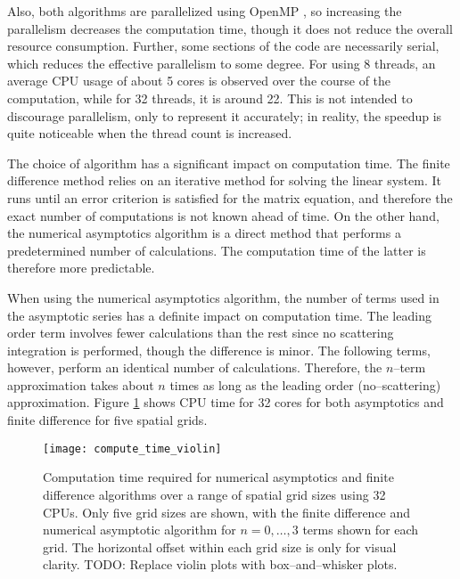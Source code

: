 Also, both algorithms are parallelized using OpenMP \cite{message_passing_interface_forum_mpi:_1993}, so increasing the parallelism decreases the computation time, though it does not reduce the overall resource consumption. %
Further, some sections of the code are necessarily serial, which reduces the effective parallelism to some degree.
For using 8 threads, an average CPU usage of about 5 cores is observed over the course of the computation, while for 32 threads, it is around 22. %
This is not intended to discourage parallelism, only to represent it accurately; in reality, the speedup is quite noticeable when the thread count is increased.

The choice of algorithm has a significant impact on computation time.
The finite difference method relies on an iterative method for solving the linear system.
It runs until an error criterion is satisfied for the matrix equation, and therefore the exact number of computations is not known ahead of time.
On the other hand, the numerical asymptotics algorithm is a direct method that performs a predetermined number of calculations.
The computation time of the latter is therefore more predictable.

When using the numerical asymptotics algorithm, the number of terms used in the asymptotic series has a definite impact on computation time.
The leading order term involves fewer calculations than the rest since no scattering integration is performed, though the difference is minor.
The following terms, however, perform an identical number of calculations.
Therefore, the $n$--term approximation takes about $n$ times as long as the leading order (no--scattering) approximation.
Figure \ref{fig:compute_time_violin} shows CPU time for 32 cores for both asymptotics and finite difference for five spatial grids.

\begin{figure}[h]
  \centering
  \texttt{[image: compute\_time\_violin]}
  \caption{Computation time required for numerical asymptotics and finite difference algorithms over a range of spatial grid sizes using 32 CPUs. Only five grid sizes are shown, with the finite difference and numerical asymptotic algorithm for $n=0,\ldots,3$ terms shown for each grid. The horizontal offset within each grid size is only for visual clarity. TODO: Replace violin plots with box--and--whisker plots.}
  \label{fig:compute_time_violin}
\end{figure}


